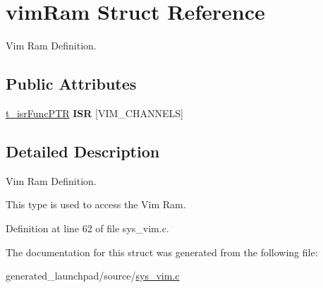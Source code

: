 \hypertarget{structvimRam}{}\section{vim\+Ram Struct Reference}
\label{structvimRam}


Vim Ram Definition.  


\subsection*{Public Attributes}
\begin{DoxyCompactItemize}
\item 
\mbox{\label{structvimRam_ad1744d2299bb64ea7eda004520648c40}} 
\mbox{\hyperlink{sys__vim_8h_a081e608fbf0927e18d08a4d8a96bf06a}{t\+\_\+isr\+Func\+P\+TR}} {\bfseries I\+SR} \mbox{[}V\+I\+M\+\_\+\+C\+H\+A\+N\+N\+E\+LS\mbox{]}
\end{DoxyCompactItemize}


\subsection{Detailed Description}
Vim Ram Definition. 

This type is used to access the Vim Ram. 

Definition at line 62 of file sys\+\_\+vim.\+c.



The documentation for this struct was generated from the following file\+:\begin{DoxyCompactItemize}
\item 
generated\+\_\+launchpad/source/\mbox{\hyperlink{sys__vim_8c}{sys\+\_\+vim.\+c}}\end{DoxyCompactItemize}
